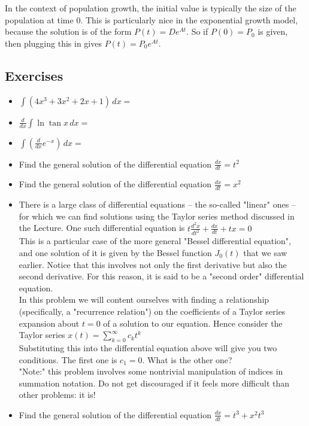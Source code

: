 \documentclass[twoside,openright,titlepage,a4paper]{book}
\begin{document}
\begin{sloppypar}
In the context of population growth, the initial value is typically the size of the population at time 0. This is particularly nice in the exponential growth model, because the solution is of the form $P(t) = De^{At}$. So if $P(0) = P_0$ is given, then plugging this in gives $P(t) = P_0e^{At}$.

\subsection{Exercises}
\begin{itemize}
\item $ \displaystyle \int (4x^3 + 3x^2 + 2x + 1) \, dx = $
\item $ \displaystyle \frac{d}{dx} \int \ln \tan x \, dx = $
\item $ \displaystyle \int \left( \frac{d}{dx} e^{-x} \right) \, dx = $
\item Find the general solution of the differential equation $ \displaystyle \frac{dx}{dt} = t^2 $
\item Find the general solution of the differential equation $ \displaystyle \frac{dx}{dt} = x^2 $
\item There is a large class of differential equations -- the so-called "linear" ones -- for which we can find solutions using the Taylor series method discussed in the Lecture. One such differential equation is $ \displaystyle t \frac{d^2x}{dt^2} + \frac{dx}{dt} + tx = 0 $\\
This is a particular case of the more general "Bessel differential equation", and one solution of it is given by the Bessel function $J_0(t)$ that we saw earlier. Notice that this involves not only the first derivative but also the second derivative. For this reason, it is said to be a "second order" differential equation.\\
In this problem we will content ourselves with finding a relationship (specifically, a "recurrence relation") on the coefficients of a Taylor series expansion about $t=0$ of a solution to our equation. Hence consider the Taylor series
$ \displaystyle x(t) = \sum_{k=0}^\infty c_k t^k $\\
Substituting this into the differential equation above will give you two conditions. The first one is $c_1 = 0$. What is the other one?\\
"Note:" this problem involves some nontrivial manipulation of indices in summation notation. Do not get discouraged if it feels more difficult than other problems: it is!
\item Find the general solution of the differential equation $ \displaystyle \frac{dx}{dt} = t^3+x^2t^3 $
\end{itemize}


\end{sloppypar}
\end{document}
